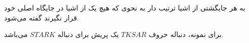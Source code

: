
\begin{definition}
    به هر جایگشتی از اشیا ترتیب دار به نحوی که هیچ یک از اشیا در
    جایگاه اصلی خود قرار نگیرند 
    گفته می‌شود.
\end{definition}

برای نمونه،
دنباله حروف
$TKSAR$
یک پریش برای دنباله
$STARK$
می‌باشد.


